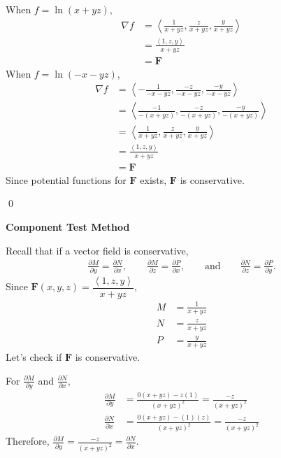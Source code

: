 \documentclass{article}
\newcommand{\lra}[1]{\left\langle #1 \right\rangle}
\newcommand{\F}[0]{\mathbf{F}}
\begin{document}
When $\displaystyle f=\ln(x+yz)$,
\begin{align*}
    \nabla f &=\lra{\frac{1}{x+yz},\frac{z}{x+yz},\frac{y}{x+yz}}\\
    &=\frac{\lra{1,z,y}}{x+yz}\\
    &=\F
\end{align*}
When $\displaystyle f=\ln(-x-yz)$,
\begin{align*}
    \nabla f &=\lra{-\frac{1}{-x-yz},\frac{-z}{-x-yz},\frac{-y}{-x-yz}}\\
    &=\lra{\frac{-1}{-(x+yz)},\frac{-z}{-(x+yz)},\frac{-y}{-(x+yz)}}\\
    &=\lra{\frac{1}{x+yz},\frac{z}{x+yz},\frac{y}{x+yz}}\\
    &=\frac{\lra{1,z,y}}{x+yz}\\
    &=\F
\end{align*}
Since potential functions for $\F$ exists, $\F$ is conservative.

\qed

{}\textbf{Component Test Method}

Recall that if a vector field is conservative,
\begin{align*}
    \frac{\partial M}{\partial y}=\frac{\partial N}{\partial x},\hspace{2em}\frac{\partial M}{\partial z}=\frac{\partial P}{\partial x},\hspace{2em} \text{and}\hspace{2em}\frac{\partial N}{\partial z}=\frac{\partial P}{\partial y}.
\end{align*}
Since $\F(x,y,z)=\dfrac{\lra{1,z,y}}{x+yz}$,
\begin{align*}
    M&=\frac{1}{x+yz}\\
    N&=\frac{z}{x+yz}\\
    P&=\frac{y}{x+yz}
\end{align*}
Let's check if $\F$ is conservative.
{}
For $\displaystyle \frac{\partial M}{\partial y}$ and $\displaystyle \frac{\partial N}{\partial x}$,
\begin{align*}
    \frac{\partial M}{\partial y}&=\frac{0(x+yz)-z(1)}{(x+yz)^2}=\frac{-z}{(x+yz)^2}\\
    \frac{\partial N}{\partial x}&=\frac{0(x+yz)-(1)(z)}{(x+yz)^2}=\frac{-z}{(x+yz)^2}
\end{align*}
Therefore, $\displaystyle \frac{\partial M}{\partial y}=\frac{-z}{(x+yz)^2}= \frac{\partial N}{\partial x}$.
\end{document}
